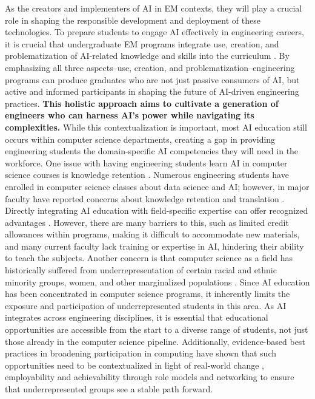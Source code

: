 \documentclass[11pt]{article}
\begin{document}
As the creators and implementers of AI in EM contexts, they will play a crucial role in shaping the responsible development and deployment of these technologies.
To prepare students to engage AI effectively in engineering careers, it is crucial that undergraduate EM programs integrate use, creation, and problematization \cite{masschelein1998imagine} of AI-related knowledge and skills into the curriculum \cite{carvalho2022can, dimitriadou2023critical}. 
By emphasizing all three aspects--use, creation, and problematization--engineering programs can produce graduates who are not just passive consumers of AI, but active and informed participants in shaping the future of AI-driven engineering practices. 
\textbf{This holistic approach aims to cultivate a generation of engineers who can harness AI's power while navigating its complexities.
}
While this contextualization is important, most AI education still occurs within computer science departments, creating a gap in providing engineering students the domain-specific AI competencies they will need in the workforce.
One issue with having engineering students learn AI in computer science courses is knowledge retention \cite{menekse2023envisioning}. 
Numerous engineering students have enrolled in computer science classes about data science and AI; however, in major faculty have reported concerns about knowledge retention and translation \cite{guzdial2010does, kay2011contextualized}.
Directly integrating AI education with field-specific expertise can offer recognized advantages \cite{guzdial2010does, mohammadi2020experiential}. However, there are many barriers to this, such as limited credit allowances within programs, making it difficult to accommodate new materials, and many current faculty lack training or expertise in AI, hindering their ability to teach the subjects. 
Another concern is that computer science as a field has historically suffered from underrepresentation of certain racial and ethnic minority groups, women, and other marginalized populations \cite{aspray2016broadening, beyer2014women, scott2017broadening, charleston2014navigating}. 
Since AI education has been concentrated in computer science programs, it inherently limits the exposure and participation of underrepresented students in this area. 
As AI integrates across engineering disciplines, it is essential that educational opportunities are accessible from the start to a diverse range of students\cite{walsh2022aspiring,stephenson2018retention}, not just those already in the computer science pipeline.
Additionally, evidence-based best practices in broadening participation in computing have shown that such opportunities need to be contextualized in light of real-world change \cite{barker2017changing}, employability \cite{cossa2021motivation}and achievability through role models and networking \cite{blaney2024sounds} to ensure that underrepresented groups see a stable path forward.
\end{document}
